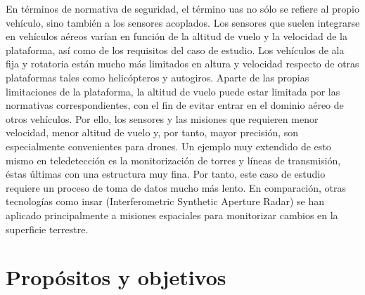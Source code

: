 En términos de normativa de seguridad, el término \acrshort{uas} no sólo se refiere al propio vehículo, sino también a los sensores acoplados. Los sensores que suelen integrarse en vehículos aéreos varían en función de la altitud de vuelo y la velocidad de la plataforma, así como de los requisitos del caso de estudio. Los vehículos de ala fija y rotatoria están mucho más limitados en altura y velocidad respecto de otras plataformas tales como helicópteros y autogiros. Aparte de las propias limitaciones de la plataforma, la altitud de vuelo puede estar limitada por las normativas correspondientes, con el fin de evitar entrar en el dominio aéreo de otros vehículos. Por ello, los sensores y las misiones que requieren menor velocidad, menor altitud de vuelo y, por tanto, mayor precisión, son especialmente convenientes para drones. Un ejemplo muy extendido de esto mismo en teledetección es la monitorización de torres y líneas de transmisión, éstas últimas con una estructura muy fina. Por tanto, este caso de estudio requiere un proceso de toma de datos mucho más lento. En comparación, otras tecnologías como \acrshort{insar} (Interferometric Synthetic Aperture Radar) se han aplicado principalmente a misiones espaciales para monitorizar cambios en la superficie terrestre.

\section{Propósitos y objetivos}

